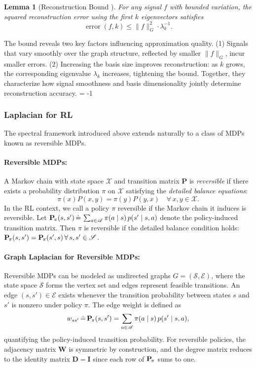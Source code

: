 \documentclass{article}
\theoremstyle{plain}
\newtheorem{lemma}[theorem]{Lemma}
\theoremstyle{definition}
\theoremstyle{remark}
\begin{document}
\begin{lemma}[Reconstruction Bound \cite{zhu2012approximating}] 
For any signal $f$ with bounded variation, the squared reconstruction error using the first $k$ eigenvectors satisfies
\begin{equation}
    \operatorname{error}(f,k) \le \|f\|_G^2 \cdot \lambda_k^{-1}.
\end{equation}
\label{lm:error_bound}
\end{lemma}

The bound reveals two key factors influencing approximation quality. (1) Signals that vary smoothly over the graph structure, reflected by smaller $\|f\|_G$, incur smaller errors. (2) Increasing the basis size improves reconstruction: as $k$ grows, the corresponding eigenvalue $\lambda_k$ increases, tightening the bound. Together, they characterize how signal smoothness and basis dimensionality jointly determine reconstruction accuracy. \looseness = -1

\subsubsection{Laplacian for RL}
The spectral framework introduced above extends naturally to a class of MDPs known as reversible MDPs.

\paragraph{Reversible MDPs:} 
A Markov chain with state space $\mathscr{X}$ and transition matrix $\mathbf{P}$ is \textit{reversible} \citep{levin2017markov} if there exists a probability distribution $\pi$ on $\mathscr{X}$ satisfying the \textit{detailed balance equations}:
\[
\pi(x) P(x, y) = \pi(y) P(y, x) \quad \forall \, x, y \in \mathscr{X}.
\]
In the RL context, we call a policy $\pi$ reversible if the Markov chain it induces is reversible. Let $\mathbf{P}_{\!\pi}(s, s') \, \dot{=} \, \sum_{a \in \mathscr{A}} \pi(a \mid s)\, p(s' \mid s, a)$ denote the policy-induced transition matrix. Then $\pi$ is reversible if the detailed balance condition holds: $\mathbf{P}_{\!\pi}(s, s') = \mathbf{P}_{\!\pi}(s', s) \, \forall \, s, s' \in \mathscr{S}$.

\paragraph{Graph Laplacian for Reversible MDPs:} 
Reversible MDPs can be modeled as undirected graphs $G = (\mathscr{S}, \mathscr{E})$, where the state space $\mathscr{S}$ forms the vertex set and edges represent feasible transitions. An edge $(s, s') \in \mathscr{E}$ exists whenever the transition probability between states $s$ and $s'$ is nonzero under policy $\pi$. The edge weight is defined as
\[
w_{ss'} \, \dot{=} \, \mathbf{P}_{\!\pi}(s, s') = \sum_{a \in \mathscr{A}} \pi(a \mid s)\, p(s' \mid s, a),
\]
quantifying the policy-induced transition probability. For reversible policies, the adjacency matrix $\mathbf{W}$ is symmetric by construction, and the degree matrix reduces to the identity matrix $\mathbf{D} = \mathbf{I}$ since each row of $\mathbf{P}_{\!\pi}$ sums to one.
\end{document}
